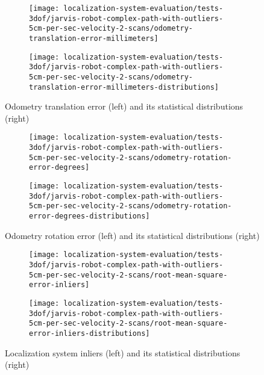 \begin{figure}[ht]
	\centering
	\begin{subfigure}[h]{.497\textwidth}
		\centering
		\texttt{[image: localization-system-evaluation/tests-3dof/jarvis-robot-complex-path-with-outliers-5cm-per-sec-velocity-2-scans/odometry-translation-error-millimeters]}
	\end{subfigure}
	\begin{subfigure}[h]{.497\textwidth}
		\centering
		\texttt{[image: localization-system-evaluation/tests-3dof/jarvis-robot-complex-path-with-outliers-5cm-per-sec-velocity-2-scans/odometry-translation-error-millimeters-distributions]}
	\end{subfigure}
	\caption{Odometry translation error (left) and its statistical distributions (right)}
	\label{fig:localization-system-evaluation_jarvis-robot-complex-path-with-outliers-5cm-per-sec-velocity-2-scans_odometry-translation-errors}
\end{figure}

\begin{figure}[ht]
	\centering
	\begin{subfigure}[h]{.497\textwidth}
		\centering
		\texttt{[image: localization-system-evaluation/tests-3dof/jarvis-robot-complex-path-with-outliers-5cm-per-sec-velocity-2-scans/odometry-rotation-error-degrees]}
	\end{subfigure}
	\begin{subfigure}[h]{.497\textwidth}
		\centering
		\texttt{[image: localization-system-evaluation/tests-3dof/jarvis-robot-complex-path-with-outliers-5cm-per-sec-velocity-2-scans/odometry-rotation-error-degrees-distributions]}
	\end{subfigure}
	\caption{Odometry rotation error (left) and its statistical distributions (right)}
	\label{fig:localization-system-evaluation_jarvis-robot-complex-path-with-outliers-5cm-per-sec-velocity-2-scans_odometry-rotation-errors}
\end{figure}

\begin{figure}[ht]
	\centering
	\begin{subfigure}[h]{.497\textwidth}
		\centering
		\texttt{[image: localization-system-evaluation/tests-3dof/jarvis-robot-complex-path-with-outliers-5cm-per-sec-velocity-2-scans/root-mean-square-error-inliers]}
	\end{subfigure}
	\begin{subfigure}[h]{.497\textwidth}
		\centering
		\texttt{[image: localization-system-evaluation/tests-3dof/jarvis-robot-complex-path-with-outliers-5cm-per-sec-velocity-2-scans/root-mean-square-error-inliers-distributions]}
	\end{subfigure}
	\caption{Localization system inliers  (left) and its statistical distributions (right)}
	\label{fig:localization-system-evaluation_jarvis-robot-complex-path-with-outliers-5cm-per-sec-velocity-2-scans_inliers-rmse}
\end{figure}

